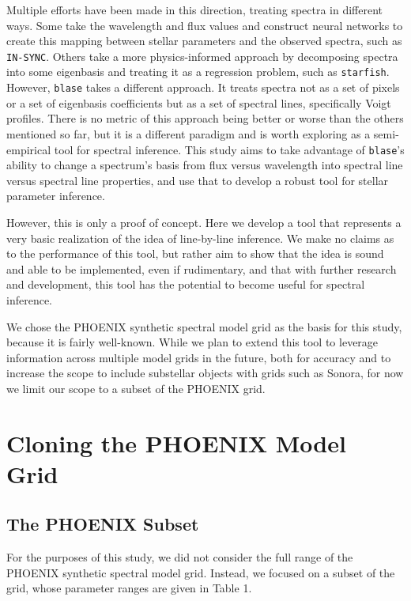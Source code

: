 \documentclass[twocolumn]{aastex631}
\begin{document}
Multiple efforts have been made in this direction, treating spectra in 
different ways. Some take the wavelength and flux values and construct
neural networks to create this mapping between stellar parameters and the
observed spectra, such as \texttt{IN-SYNC}. Others take a more 
physics-informed approach by decomposing spectra into some eigenbasis and 
treating it as a regression problem, such as \texttt{starfish}.
However, \texttt{blase} takes a different approach. It treats spectra not as 
a set of pixels or a set of eigenbasis coefficients but as a set of 
spectral lines, specifically Voigt profiles. There is no metric of this 
approach being better or worse than the others mentioned so far, but it is 
a different paradigm and is worth exploring as a semi-empirical tool for
spectral inference. This study aims to take advantage of \texttt{blase}'s
ability to change a spectrum's basis from flux versus wavelength into
spectral line versus spectral line properties, and use that to develop a
robust tool for stellar parameter inference.

However, this is only a proof of concept. Here we develop a tool that 
represents a very basic realization of the idea of line-by-line inference. 
We make no claims as to the performance of this tool, but rather aim to show 
that the idea is sound and able to be implemented, even if rudimentary, and 
that with further research and development, this tool has the potential to 
become useful for spectral inference.

We chose the PHOENIX synthetic spectral model grid as the basis for this 
study, because it is fairly well-known. While we plan to extend this tool to 
leverage information across multiple model grids in the future, both for 
accuracy and to increase the scope to include substellar objects with grids
such as Sonora, for now we limit our scope to a subset of the PHOENIX grid.

\section{Cloning the PHOENIX Model Grid}
\subsection{The PHOENIX Subset}
For the purposes of this study, we did not consider the full range of the
PHOENIX synthetic spectral model grid. Instead, we focused on a subset of 
the grid, whose parameter ranges are given in Table 1.
\end{document}
